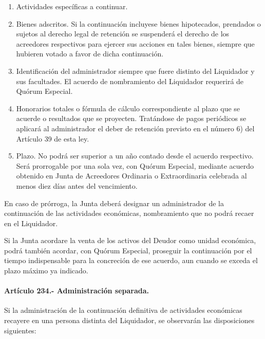 \documentclass[
]{book}
\begin{document}
\begin{enumerate}
\def\labelenumi{\arabic{enumi})}
\item
  Actividades específicas a continuar.
\item
  Bienes adscritos. Si la continuación incluyese bienes hipotecados, prendados o sujetos al derecho legal de retención se suspenderá el derecho de los acreedores respectivos para ejercer sus acciones en tales bienes, siempre que hubieren votado a favor de dicha continuación.
\item
  Identificación del administrador siempre que fuere distinto del Liquidador y sus facultades. El acuerdo de nombramiento del Liquidador requerirá de Quórum Especial.
\item
  Honorarios totales o fórmula de cálculo correspondiente al plazo que se acuerde o resultados que se proyecten. Tratándose de pagos periódicos se aplicará al administrador el deber de retención previsto en el número 6) del Artículo 39 de esta ley.
\item
  Plazo. No podrá ser superior a un año contado desde el acuerdo respectivo. Será prorrogable por una sola vez, con Quórum Especial, mediante acuerdo obtenido en Junta de Acreedores Ordinaria o Extraordinaria celebrada al menos diez días antes del vencimiento.
\end{enumerate}

En caso de prórroga, la Junta deberá designar un administrador de la continuación de las actividades económicas, nombramiento que no podrá recaer en el Liquidador.

Si la Junta acordare la venta de los activos del Deudor como unidad económica, podrá también acordar, con Quórum Especial, proseguir la continuación por el tiempo indispensable para la concreción de ese acuerdo, aun cuando se exceda el plazo máximo ya indicado.

\hypertarget{artuxedculo-234.--administraciuxf3n-separada.}{%
\paragraph*{Artículo 234.- Administración separada.}\label{artuxedculo-234.--administraciuxf3n-separada.}}

Si la administración de la continuación definitiva de actividades económicas recayere en una persona distinta del Liquidador, se observarán las disposiciones siguientes:
\end{document}
